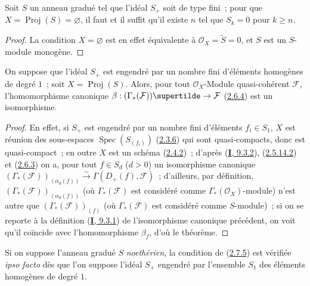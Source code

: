 \begin{corollary}[2.7.4]
\label{II.2.7.4-fr}
Soit $S$ un anneau gradué tel que l'idéal $S_+$ soit de type fini~; pour que
$X=\operatorname{Proj}(S)=\varnothing$, il faut et il suffit qu'il existe $n$
tel que $S_k=0$ pour $k\geq n$.
\end{corollary}

\begin{proof}
La condition $X=\varnothing$ est en effet équivalente à
$\mathcal{O}_X=\widetilde{S}=0$, et $S$ est un $S$-module monogène.
\end{proof}

\begin{theorem}[2.7.5]
\label{II.2.7.5-fr}
On suppose que l'idéal $S_+$ est engendré par un nombre fini d'éléments
homogènes de degré $1$~; soit $X=\operatorname{Proj}(S)$. Alors, pour tout
$\mathcal{O}_X$-Module quasi-cohérent $\mathcal{F}$, l'homomorphisme
canonique $\beta:(\Gamma_*(\mathcal{F}))\supertilde
\to\mathcal{F}$ \textup{(\hyperref[II.2.6.4-fr]{2.6.4})} est un isomorphisme.
\end{theorem}

\begin{proof}
En effet, si $S_+$ est engendré par un nombre fini d'éléments $f_i\in S_1$,
$X$ est réunion des sous-espaces $\operatorname{Spec}(S_{(f_i)})$
(\hyperref[II.2.3.6-fr]{2.3.6}) qui sont quasi-compacts, donc est
quasi-compact~; en outre $X$ est un schéma
(\hyperref[II.2.4.2-fr]{2.4.2})~; d'après
(\hyperref[I.9.3.2-fr]{\textbf{I}, 9.3.2}),
(\hyperref[II.2.5.14.2-fr]{2.5.14.2}) et
(\hyperref[II.2.6.3-fr]{2.6.3}) on a, pour tout $f\in S_d$ ($d>0$) un
isomorphisme canonique
$(\Gamma_*(\mathcal{F}))_{(\alpha_d(f))}\xrightarrow{\sim}
\Gamma(D_+(f),\mathcal{F})$~; d'ailleurs, par définition,
$(\Gamma_*(\mathcal{F}))_{(\alpha_d(f))}$ (où $\Gamma_*(\mathcal{F})$ est
considéré comme $\Gamma_*(\mathcal{O}_X)$-module) n'est autre que
$(\Gamma_*(\mathcal{F}))_{(f)}$ (où $\Gamma_*(\mathcal{F})$ est considéré
comme $S$-module)~; si on se reporte à la définition
(\hyperref[I.9.3.1-fr]{\textbf{I}, 9.3.1}) de l'isomorphisme canonique précédent, on
voit qu'il coïncide avec l'homomorphisme $\beta_f$, d'où le théorème.
\end{proof}

\begin{remark}[2.7.6]
\label{II.2.7.6-fr}
Si on suppose l'anneau gradué $S$ \emph{noethérien}, la condition de
(\hyperref[II.2.7.5-fr]{2.7.5}) est vérifiée \emph{ipso facto} dès que l'on
suppose l'idéal $S_+$ engendré par l'ensemble $S_1$ des éléments homogènes de
degré $1$.
\end{remark}

